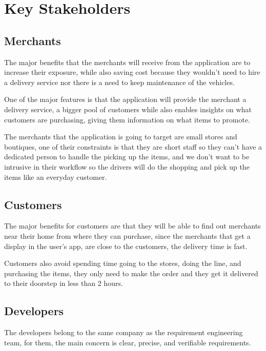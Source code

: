 \section{Key Stakeholders}

\subsection{Merchants}
The major benefits that the merchants will receive from the application are to 
increase their exposure, while also saving cost because they wouldn't need to 
hire a delivery service nor there is a need to keep maintenance 
of the vehicles.\newline

\noindent One of the major features is that the application will provide the 
merchant a delivery service, a bigger pool of customers while also enables 
insights on what customers are purchasing, giving them information on what 
items to promote.\newline

\noindent The merchants that the application is going to target are small 
stores and boutiques, one of their constraints is that they are short staff so 
they can't have a dedicated person to handle the picking up the items, and we 
don’t want to be intrusive in their workflow so the drivers will do the 
shopping and pick up the items like an everyday customer.

\subsection{Customers}
The major benefits for customers are that they will be able to find out 
merchants near their home from where they can purchase, since the merchants 
that get a display in the user's app, are close to the customers, the delivery 
time is fast. \newline

\noindent Customers also avoid spending time going to the stores, doing the 
line, and purchasing the items, they only need to make the order and they get 
it delivered to their doorstep in less than 2 hours.

\subsection{Developers}
The developers belong to the same company as the requirement engineering team, 
for them, the main concern is clear, precise, and verifiable requirements.


